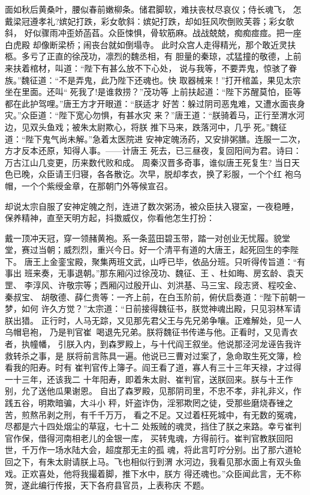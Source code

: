 面如秋后黄桑叶，腰似春前嫩柳条。储君脚软，难扶丧杖尽哀仪；侍长魂飞，
怎戴梁冠遵孝礼?嫔妃打跌，彩女欹斜：嫔妃打跌，却如狂风吹倒败芙蓉；彩女欹斜，
好似骤雨冲歪娇菡萏。众臣悚惧，骨软筋麻。战战兢兢，痴痴痖痖。把一座白虎殿
却像断梁桥；闹丧台就如倒塌寺。
此时众宫人走得精光，那个敢近灵扶柩。多亏了正直的徐茂功，凛烈的魏丞相，有
胆量的秦琼，忒猛撞的敬德，上前来扶着棺材，叫道：“陛下有甚么放不下心处，
说与我等，不要弄鬼，惊骇了眷族。”魏征道：“不是弄鬼，此乃陛下还魂也。快
取器械来！”打开棺盖，果见太宗坐在里面。还叫“死我了!是谁救捞？”茂功等
上前扶起道：“陛下苏醒莫怕，臣等都在此护驾哩。”唐王方才开眼道：“朕适才
好苦：躲过阴司恶鬼难，又遭水面丧身灾。”众臣道：“陛下宽心勿惧，有甚水灾
来？”唐王道：“朕骑着马，正行至渭水河边，见双头鱼戏；被朱太尉欺心，将朕
推下马来，跌落河中，几乎死。”魏征道：“陛下鬼气尚未解。”急着太医院进
安神定魄汤药，又安排粥膳。连服一二次，方才反本还原，知得人事。——计唐王
死去，已三昼夜，复回阳间为君。诗曰：
万古江山几变更，历来数代败和成。
周秦汉晋多奇事，谁似唐王死复生?
当日天色已晚，众臣请王归寝，各各散讫。次早，脱却孝衣，换了彩服，一个个红
袍乌帽，一个个紫绶金章，在那朝门外等候宣召。

却说太宗自服了安神定魄之剂，连进了数次粥汤，被众臣扶入寝室，一夜稳睡，
保养精神，直至天明方起，抖擞威仪，你看他怎生打扮：

戴一顶冲天冠，穿一领赭黄袍。系一条蓝田碧玉带，踏一对创业无忧履。貌堂
堂，赛过当朝；威烈烈，重兴今日。好一个清平有道的大唐王，起死回生的李陛下。
唐王上金銮宝殿，聚集两班文武，山呼已毕，依品分班。只听得传旨道：“有事出
班来奏，无事退朝。”那东厢闪过徐茂功、魏征、王、杜如晦、房玄龄、袁天罡、
李淳风、许敬宗等；西厢闪过殷开山、刘洪基、马三宝、段志贤、程咬金、秦叔宝、
胡敬德、薛仁贵等：一齐上前，在白玉阶前，俯伏启奏道：“陛下前朝一梦，如何
许久方觉？”太宗道：“日前接得魏征书，朕觉神魂出殿，只见羽林军请朕出猎。
正行时，人马无踪，又见那先君父王与先兄弟争嚷。正难解处，见一人乌帽皂袍，
乃是判官崔，喝退先兄弟。朕将魏征书传递与他。正看时，又见青衣者，执幢幡，
引朕入内，到森罗殿上，与十代阎王叙坐。他说那泾河龙诬告我许救转杀之事，是
朕将前言陈具一遍。他说已三曹对过案了，急命取生死文簿，检看我的阳寿。时有
崔判官传上簿子。阎王看了道，寡人有三十三年天禄，才过得一十三年，还该我二
十年阳寿，即着朱太尉、崔判官，送朕回来。朕与十王作别，允了送他瓜果谢恩。
自出了森罗殿，见那阴司里，不忠不孝，非礼非义，作践五谷，明欺暗骗，大斗小
秤，奸盗诈伪，淫邪欺罔之徒，受那些磨烧舂锉之苦，煎熬吊剥之刑，有千千万万，
看之不足。又过着枉死城中，有无数的冤魂，尽都是六十四处烟尘的草寇，七十二
处叛贼的魂灵，挡住了朕之来路。幸亏崔判官作保，借得河南相老儿的金银一库，
买转鬼魂，方得前行。崔判官教朕回阳世，千万作一场水陆大会，超度那无主的孤
魂，将此言叮咛分别。出了那六道轮回之下，有朱太尉请朕上马。飞也相似行到渭
水河边，我看见那水面上有双头鱼戏。正欢喜处，他将我撮着脚，推下水中，朕方
得还魂也。”众臣闻此言，无不称贺，遂此编行传报，天下各府县官员，上表称庆
不题。

